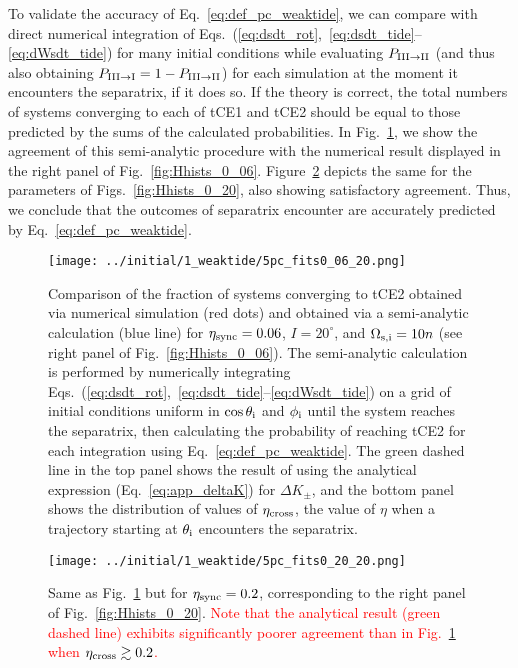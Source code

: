 \documentclass[
        fleqn,
        usenatbib,
        referee
    ]{mnras}
\newlength{\colummwidth}
\begin{document}
To validate the accuracy of Eq.~\eqref{eq:def_pc_weaktide}, we can compare with
direct numerical integration of
Eqs.~(\ref{eq:dsdt_rot},~\ref{eq:dsdt_tide}--\ref{eq:dWsdt_tide}) for many
initial conditions while evaluating $P_{\rm III \to II}$ (and thus also
obtaining $P_{\rm III \to I} = 1 - P_{\rm III \to II}$) for each simulation at
the moment it encounters the separatrix, if it does so. If the theory is
correct, the total numbers of systems converging to each of tCE1 and tCE2 should
be equal to those predicted by the sums of the calculated probabilities. In
Fig.~\ref{fig:pc_fits_0_06}, we show the agreement of this semi-analytic
procedure with the numerical result displayed in the right panel of
Fig.~\ref{fig:Hhists_0_06}. Figure~\ref{fig:pc_fits_0_20} depicts the same for
the parameters of Figs.~\ref{fig:Hhists_0_20}, also showing satisfactory
agreement. Thus, we conclude that the outcomes of separatrix encounter are
accurately predicted by Eq.~\eqref{eq:def_pc_weaktide}.
\begin{figure}
    \centering
    \texttt{[image: ../initial/1\_weaktide/5pc\_fits0\_06\_20.png]}
    \caption{Comparison of the fraction of systems converging to tCE2 obtained
    via numerical simulation (red dots) and obtained via a semi-analytic
    calculation (blue line) for $\eta_{\rm sync} = 0.06$, $I = 20^\circ$, and
    $\Omega_{\rm s, i} = 10n$ (see right panel of Fig.~\ref{fig:Hhists_0_06}).
    The semi-analytic calculation is performed by numerically integrating
    Eqs.~(\ref{eq:dsdt_rot},~\ref{eq:dsdt_tide}--\ref{eq:dWsdt_tide}) on a grid
    of initial conditions uniform in $\cos \theta_{\rm i}$ and $\phi_{\rm i}$
    until the system reaches the separatrix, then calculating the probability of
    reaching tCE2 for each integration using Eq.~\eqref{eq:def_pc_weaktide}. The
    green dashed line in the top panel shows the result of using the analytical
    expression (Eq.~\ref{eq:app_deltaK}) for $\Delta K_{\pm}$, and the bottom
    panel shows the distribution of values of $\eta_{\rm cross}$, the value of
    $\eta$ when a trajectory starting at $\theta_{\rm i}$ encounters the
    separatrix. }\label{fig:pc_fits_0_06}
\end{figure}
\begin{figure}
    \centering
    \texttt{[image: ../initial/1\_weaktide/5pc\_fits0\_20\_20.png]}
    \caption{Same as Fig.~\ref{fig:pc_fits_0_06} but for $\eta_{\rm sync} =
    0.2$, corresponding to the right panel of
    Fig.~\ref{fig:Hhists_0_20}. \textcolor{red}{Note that the analytical result
    (green dashed line) exhibits significantly poorer agreement than in
    Fig.~\ref{fig:pc_fits_0_06} when $\eta_{\rm cross} \gtrsim 0.2$.}
    }\label{fig:pc_fits_0_20}
\end{figure}
\end{document}
